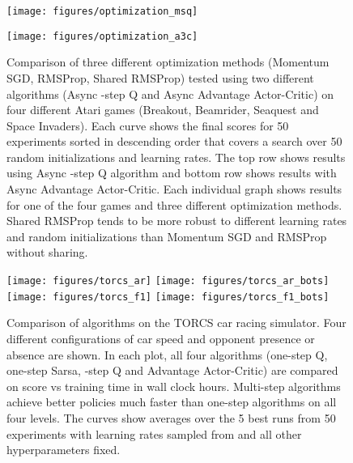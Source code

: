 \documentclass{article} \usepackage{times}
\begin{document}
\begin{figure}[t]
\begin{center}
\centerline{\texttt{[image: figures/optimization\_msq]}}
\centerline{\texttt{[image: figures/optimization\_a3c]}}
\caption{\label{fig-optimization} Comparison of three different optimization methods (Momentum SGD, RMSProp, Shared RMSProp) tested using two different algorithms (Async -step Q and Async Advantage Actor-Critic) on four different Atari games (Breakout, Beamrider, Seaquest and Space Invaders). Each curve shows the final scores for 50 experiments sorted in descending order that covers a search over 50 random initializations and learning rates. The top row shows results using Async -step Q algorithm and bottom row shows results with Async Advantage Actor-Critic. Each individual graph shows results for one of the four games and three different optimization methods. Shared RMSProp tends to be more robust to different learning rates and random initializations than Momentum SGD and RMSProp without sharing.}
\vspace{-0.5cm}
\end{center}
\end{figure}

\begin{figure}[h]
\begin{center}
\texttt{[image: figures/torcs\_ar]}
\texttt{[image: figures/torcs\_ar\_bots]} \\
\texttt{[image: figures/torcs\_f1]}
\texttt{[image: figures/torcs\_f1\_bots]}
\caption{\label{fig-torcs} Comparison of algorithms on the TORCS car racing simulator. Four different configurations of car speed and opponent presence or absence are shown. In each plot, all four algorithms (one-step Q, one-step Sarsa, -step Q and Advantage Actor-Critic) are compared on score vs training time in wall clock hours. Multi-step algorithms achieve better policies much faster than one-step algorithms on all four levels. The curves show averages over the 5 best runs from 50 experiments with learning rates sampled from  and all other hyperparameters fixed.}
\vspace{-0.5cm}
\end{center}
\end{figure}
\end{document}

